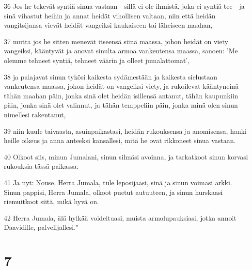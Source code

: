 \par 36 Jos he tekevät syntiä sinua vastaan - sillä ei ole ihmistä, joka ei syntiä tee - ja sinä vihastut heihin ja annat heidät vihollisen valtaan, niin että heidän vangitsijansa vievät heidät vangeiksi kaukaiseen tai läheiseen maahan,
\par 37 mutta jos he sitten menevät itseensä siinä maassa, johon heidät on viety vangeiksi, kääntyvät ja anovat sinulta armoa vankeutensa maassa, sanoen: 'Me olemme tehneet syntiä, tehneet väärin ja olleet jumalattomat',
\par 38 ja palajavat sinun tykösi kaikesta sydämestään ja kaikesta sielustaan vankeutensa maassa, johon heidät on vangeiksi viety, ja rukoilevat kääntyneinä tähän maahan päin, jonka sinä olet heidän isillensä antanut, tähän kaupunkiin päin, jonka sinä olet valinnut, ja tähän temppeliin päin, jonka minä olen sinun nimellesi rakentanut,
\par 39 niin kuule taivaasta, asuinpaikastasi, heidän rukouksensa ja anomisensa, hanki heille oikeus ja anna anteeksi kansallesi, mitä he ovat rikkoneet sinua vastaan.
\par 40 Olkoot siis, minun Jumalani, sinun silmäsi avoinna, ja tarkatkoot sinun korvasi rukouksia tässä paikassa.
\par 41 Ja nyt: Nouse, Herra Jumala, tule leposijaasi, sinä ja sinun voimasi arkki. Sinun pappisi, Herra Jumala, olkoot puetut autuuteen, ja sinun hurskaasi riemuitkoot siitä, mikä hyvä on.
\par 42 Herra Jumala, älä hylkää voideltuasi; muista armolupauksiasi, jotka annoit Daavidille, palvelijallesi."

\chapter{7}

